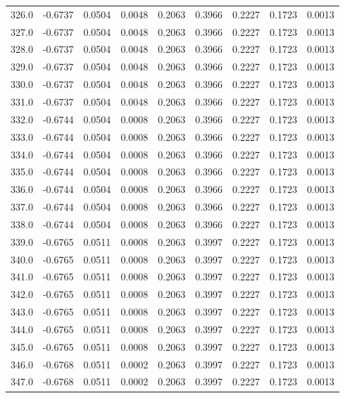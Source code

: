 \begin{longtable}{lrrrrrrrr}
326.0 & -0.6737 & 0.0504 & 0.0048 & 0.2063 & 0.3966 & 0.2227 & 0.1723 & 0.0013 \\
327.0 & -0.6737 & 0.0504 & 0.0048 & 0.2063 & 0.3966 & 0.2227 & 0.1723 & 0.0013 \\
328.0 & -0.6737 & 0.0504 & 0.0048 & 0.2063 & 0.3966 & 0.2227 & 0.1723 & 0.0013 \\
329.0 & -0.6737 & 0.0504 & 0.0048 & 0.2063 & 0.3966 & 0.2227 & 0.1723 & 0.0013 \\
330.0 & -0.6737 & 0.0504 & 0.0048 & 0.2063 & 0.3966 & 0.2227 & 0.1723 & 0.0013 \\
331.0 & -0.6737 & 0.0504 & 0.0048 & 0.2063 & 0.3966 & 0.2227 & 0.1723 & 0.0013 \\
332.0 & -0.6744 & 0.0504 & 0.0008 & 0.2063 & 0.3966 & 0.2227 & 0.1723 & 0.0013 \\
333.0 & -0.6744 & 0.0504 & 0.0008 & 0.2063 & 0.3966 & 0.2227 & 0.1723 & 0.0013 \\
334.0 & -0.6744 & 0.0504 & 0.0008 & 0.2063 & 0.3966 & 0.2227 & 0.1723 & 0.0013 \\
335.0 & -0.6744 & 0.0504 & 0.0008 & 0.2063 & 0.3966 & 0.2227 & 0.1723 & 0.0013 \\
336.0 & -0.6744 & 0.0504 & 0.0008 & 0.2063 & 0.3966 & 0.2227 & 0.1723 & 0.0013 \\
337.0 & -0.6744 & 0.0504 & 0.0008 & 0.2063 & 0.3966 & 0.2227 & 0.1723 & 0.0013 \\
338.0 & -0.6744 & 0.0504 & 0.0008 & 0.2063 & 0.3966 & 0.2227 & 0.1723 & 0.0013 \\
339.0 & -0.6765 & 0.0511 & 0.0008 & 0.2063 & 0.3997 & 0.2227 & 0.1723 & 0.0013 \\
340.0 & -0.6765 & 0.0511 & 0.0008 & 0.2063 & 0.3997 & 0.2227 & 0.1723 & 0.0013 \\
341.0 & -0.6765 & 0.0511 & 0.0008 & 0.2063 & 0.3997 & 0.2227 & 0.1723 & 0.0013 \\
342.0 & -0.6765 & 0.0511 & 0.0008 & 0.2063 & 0.3997 & 0.2227 & 0.1723 & 0.0013 \\
343.0 & -0.6765 & 0.0511 & 0.0008 & 0.2063 & 0.3997 & 0.2227 & 0.1723 & 0.0013 \\
344.0 & -0.6765 & 0.0511 & 0.0008 & 0.2063 & 0.3997 & 0.2227 & 0.1723 & 0.0013 \\
345.0 & -0.6765 & 0.0511 & 0.0008 & 0.2063 & 0.3997 & 0.2227 & 0.1723 & 0.0013 \\
346.0 & -0.6768 & 0.0511 & 0.0002 & 0.2063 & 0.3997 & 0.2227 & 0.1723 & 0.0013 \\
347.0 & -0.6768 & 0.0511 & 0.0002 & 0.2063 & 0.3997 & 0.2227 & 0.1723 & 0.0013 \\

\end{longtable}
